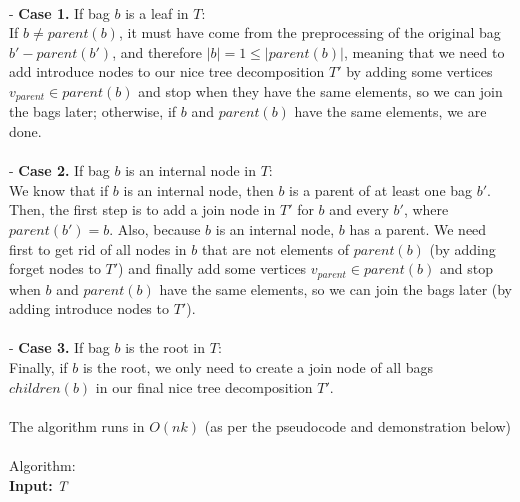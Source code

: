 \documentclass{article}
\newcommand\tab[1][1cm]{\hspace*{#1}}
\begin{document}
\\
- \textbf{Case 1.} If bag $b$ is a leaf in $T$:
\\
\tab If $b \neq parent(b)$, it must have come from the preprocessing of the original bag $b' - parent(b')$, and therefore $|b| = 1 \leq |parent(b)|$, meaning that we need to add introduce nodes to our nice tree decomposition $T'$ by adding some vertices $v_{parent} \in parent(b)$ and stop when they have the same elements, so we can join the bags later; otherwise, if $b$ and $parent(b)$ have the same elements, we are done.
\\
\\
- \textbf{Case 2.} If bag $b$ is an internal node in $T$:
\\
\tab We know that if $b$ is an internal node, then $b$ is a parent of at least one bag $b'$.  Then, the first step is to add a join node in $T'$ for $b$ and every $b'$, where $parent(b') = b$. Also, because $b$ is an internal node, $b$ has a parent. We need first to get rid of all nodes in $b$ that are not elements of $parent(b)$ (by adding forget nodes to $T'$) and finally add some vertices  $v_{parent} \in parent(b)$ and stop when $b$ and $parent(b)$ have the same elements, so we can join the bags later (by adding introduce nodes to $T'$).
\\
\\
- \textbf{Case 3.} If bag $b$ is the root in $T$:
\\
\tab Finally, if $b$ is the root, we only need to create a join node of all bags $children(b)$ in our final nice tree decomposition $T'$.
\\
\\
The algorithm runs in $O(nk)$ (as per the pseudocode and demonstration below)
\\
\\
Algorithm:\\
\textbf{Input:} \textit{T}
\end{document}
